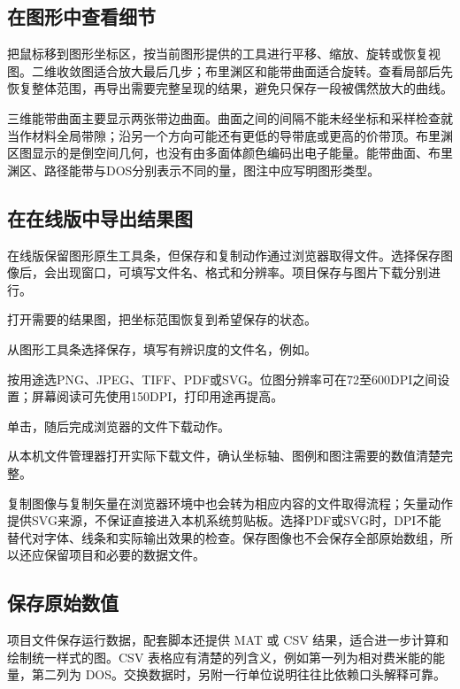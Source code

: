\subsection{在图形中查看细节}

把鼠标移到图形坐标区，按当前图形提供的工具进行平移、缩放、旋转或恢复视图。二维收敛图适合放大最后几步；布里渊区和能带曲面适合旋转。查看局部后先恢复整体范围，再导出需要完整呈现的结果，避免只保存一段被偶然放大的曲线。

三维能带曲面主要显示两张带边曲面。曲面之间的间隔不能未经坐标和采样检查就当作材料全局带隙；沿另一个方向可能还有更低的导带底或更高的价带顶。布里渊区图显示的是倒空间几何，也没有由多面体颜色编码出电子能量。能带曲面、布里渊区、路径能带与DOS分别表示不同的量，图注中应写明图形类型。

\subsection{在在线版中导出结果图}

在线版保留图形原生工具条，但保存和复制动作通过浏览器取得文件。选择保存图像后，会出现窗口，可填写文件名、格式和分辨率。项目保存与图片下载分别进行。

\begin{steps}
\item 打开需要的结果图，把坐标范围恢复到希望保存的状态。
\item 从图形工具条选择保存，填写有辨识度的文件名，例如。
\item 按用途选PNG、JPEG、TIFF、PDF或SVG。位图分辨率可在72至600DPI之间设置；屏幕阅读可先使用150DPI，打印用途再提高。
\item 单击，随后完成浏览器的文件下载动作。
\item 从本机文件管理器打开实际下载文件，确认坐标轴、图例和图注需要的数值清楚完整。
\end{steps}

复制图像与复制矢量在浏览器环境中也会转为相应内容的文件取得流程；矢量动作提供SVG来源，不保证直接进入本机系统剪贴板。选择PDF或SVG时，DPI不能替代对字体、线条和实际输出效果的检查。保存图像也不会保存全部原始数组，所以还应保留项目和必要的数据文件。


\subsection{保存原始数值}

项目文件保存运行数据，配套脚本还提供 MAT 或 CSV 结果，适合进一步计算和绘制统一样式的图。CSV 表格应有清楚的列含义，例如第一列为相对费米能的能量，第二列为 DOS。交换数据时，另附一行单位说明往往比依赖口头解释可靠。

